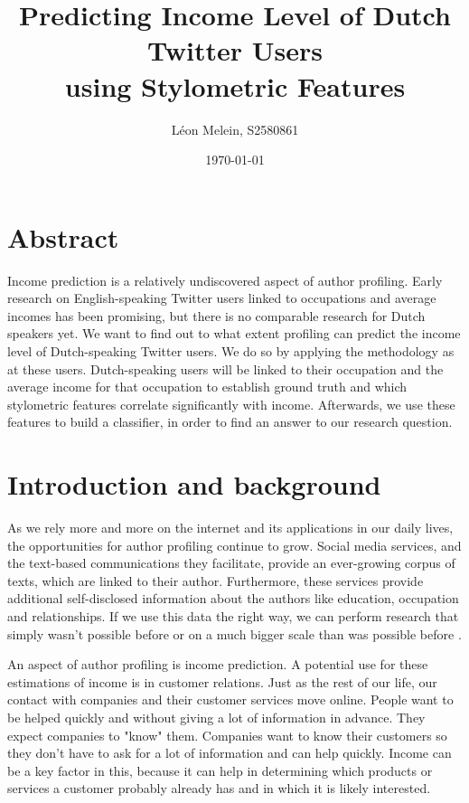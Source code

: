 \documentclass[11pt, a4paper]{article}
\begin{document}
\title{Predicting Income Level of Dutch Twitter Users\\using Stylometric Features}
\author{L\'eon Melein, S2580861}
\date{\today}
\maketitle
\section*{Abstract}
Income prediction is a relatively undiscovered aspect of author profiling. Early research on English-speaking Twitter users linked to occupations and average incomes has been promising, but there is no comparable research for Dutch speakers yet. We want to find out to what extent profiling can predict the income level of Dutch-speaking Twitter users. We do so by applying the methodology as \citet{flekova} at these users. Dutch-speaking users will be linked to their occupation and the average income for that occupation to establish ground truth and which stylometric features correlate significantly with income. Afterwards, we use these features to build a classifier, in order to find an answer to our research question.

\newpage
\section{Introduction and background}
As we rely more and more on the internet and its applications in our daily lives, the opportunities for author profiling continue to grow. Social media services, and the text-based communications they facilitate, provide an ever-growing corpus of texts, which are linked to their author. Furthermore, these services provide additional self-disclosed information about the authors like education, occupation and relationships. If we use this data the right way, we can perform research that simply wasn't possible before or on a much bigger scale than was possible before \citep{sloan}.

An aspect of author profiling is income prediction. A potential use for these estimations of income is in customer relations. Just as the rest of our life, our contact with companies and their customer services move online. People want to be helped quickly and without giving a lot of information in advance. They expect companies to "know" them. Companies want to know their customers so they don't have to ask for a lot of information and can help quickly. Income can be a key factor in this, because it can help in determining which products or services a customer probably already has and in which it is likely interested.
\end{document}
